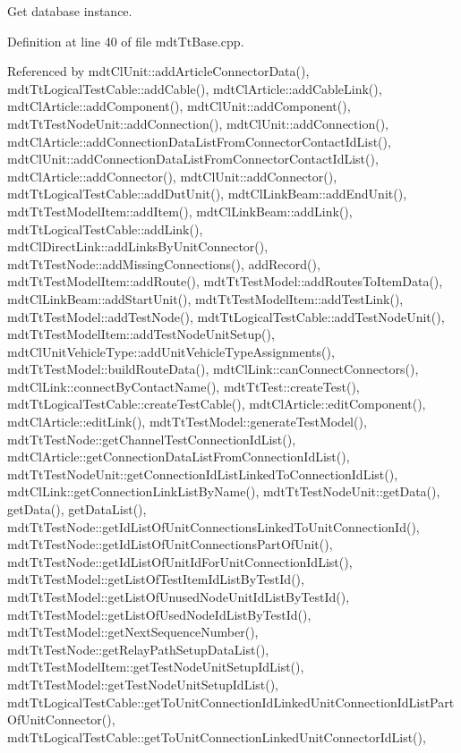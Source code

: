 Get database instance. 



Definition at line 40 of file mdt\-Tt\-Base.\-cpp.



Referenced by mdt\-Cl\-Unit\-::add\-Article\-Connector\-Data(), mdt\-Tt\-Logical\-Test\-Cable\-::add\-Cable(), mdt\-Cl\-Article\-::add\-Cable\-Link(), mdt\-Cl\-Article\-::add\-Component(), mdt\-Cl\-Unit\-::add\-Component(), mdt\-Tt\-Test\-Node\-Unit\-::add\-Connection(), mdt\-Cl\-Unit\-::add\-Connection(), mdt\-Cl\-Article\-::add\-Connection\-Data\-List\-From\-Connector\-Contact\-Id\-List(), mdt\-Cl\-Unit\-::add\-Connection\-Data\-List\-From\-Connector\-Contact\-Id\-List(), mdt\-Cl\-Article\-::add\-Connector(), mdt\-Cl\-Unit\-::add\-Connector(), mdt\-Tt\-Logical\-Test\-Cable\-::add\-Dut\-Unit(), mdt\-Cl\-Link\-Beam\-::add\-End\-Unit(), mdt\-Tt\-Test\-Model\-Item\-::add\-Item(), mdt\-Cl\-Link\-Beam\-::add\-Link(), mdt\-Tt\-Logical\-Test\-Cable\-::add\-Link(), mdt\-Cl\-Direct\-Link\-::add\-Links\-By\-Unit\-Connector(), mdt\-Tt\-Test\-Node\-::add\-Missing\-Connections(), add\-Record(), mdt\-Tt\-Test\-Model\-Item\-::add\-Route(), mdt\-Tt\-Test\-Model\-::add\-Routes\-To\-Item\-Data(), mdt\-Cl\-Link\-Beam\-::add\-Start\-Unit(), mdt\-Tt\-Test\-Model\-Item\-::add\-Test\-Link(), mdt\-Tt\-Test\-Model\-::add\-Test\-Node(), mdt\-Tt\-Logical\-Test\-Cable\-::add\-Test\-Node\-Unit(), mdt\-Tt\-Test\-Model\-Item\-::add\-Test\-Node\-Unit\-Setup(), mdt\-Cl\-Unit\-Vehicle\-Type\-::add\-Unit\-Vehicle\-Type\-Assignments(), mdt\-Tt\-Test\-Model\-::build\-Route\-Data(), mdt\-Cl\-Link\-::can\-Connect\-Connectors(), mdt\-Cl\-Link\-::connect\-By\-Contact\-Name(), mdt\-Tt\-Test\-::create\-Test(), mdt\-Tt\-Logical\-Test\-Cable\-::create\-Test\-Cable(), mdt\-Cl\-Article\-::edit\-Component(), mdt\-Cl\-Article\-::edit\-Link(), mdt\-Tt\-Test\-Model\-::generate\-Test\-Model(), mdt\-Tt\-Test\-Node\-::get\-Channel\-Test\-Connection\-Id\-List(), mdt\-Cl\-Article\-::get\-Connection\-Data\-List\-From\-Connection\-Id\-List(), mdt\-Tt\-Test\-Node\-Unit\-::get\-Connection\-Id\-List\-Linked\-To\-Connection\-Id\-List(), mdt\-Cl\-Link\-::get\-Connection\-Link\-List\-By\-Name(), mdt\-Tt\-Test\-Node\-Unit\-::get\-Data(), get\-Data(), get\-Data\-List(), mdt\-Tt\-Test\-Node\-::get\-Id\-List\-Of\-Unit\-Connections\-Linked\-To\-Unit\-Connection\-Id(), mdt\-Tt\-Test\-Node\-::get\-Id\-List\-Of\-Unit\-Connections\-Part\-Of\-Unit(), mdt\-Tt\-Test\-Node\-::get\-Id\-List\-Of\-Unit\-Id\-For\-Unit\-Connection\-Id\-List(), mdt\-Tt\-Test\-Model\-::get\-List\-Of\-Test\-Item\-Id\-List\-By\-Test\-Id(), mdt\-Tt\-Test\-Model\-::get\-List\-Of\-Unused\-Node\-Unit\-Id\-List\-By\-Test\-Id(), mdt\-Tt\-Test\-Model\-::get\-List\-Of\-Used\-Node\-Id\-List\-By\-Test\-Id(), mdt\-Tt\-Test\-Model\-::get\-Next\-Sequence\-Number(), mdt\-Tt\-Test\-Node\-::get\-Relay\-Path\-Setup\-Data\-List(), mdt\-Tt\-Test\-Model\-Item\-::get\-Test\-Node\-Unit\-Setup\-Id\-List(), mdt\-Tt\-Test\-Model\-::get\-Test\-Node\-Unit\-Setup\-Id\-List(), mdt\-Tt\-Logical\-Test\-Cable\-::get\-To\-Unit\-Connection\-Id\-Linked\-Unit\-Connection\-Id\-List\-Part\-Of\-Unit\-Connector(), mdt\-Tt\-Logical\-Test\-Cable\-::get\-To\-Unit\-Connection\-Linked\-Unit\-Connector\-Id\-List(), 